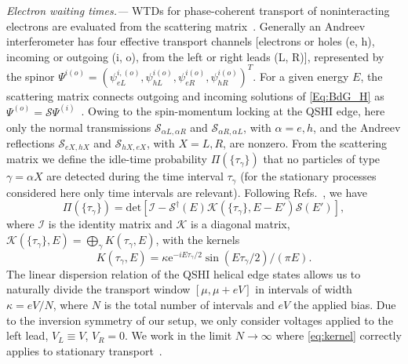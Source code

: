 \documentclass[aps,prl,amsmath,twocolumn,floatfix,superscriptaddress,longbibliography,footinbib]{revtex4-1}
\newcommand{\e}{\mathrm{e}}
\begin{document}
\textit{Electron waiting times.---}
WTDs for phase-coherent transport of noninteracting electrons are evaluated from the scattering matrix~\cite{Albert2012,Haack2014,Mi2018}. 
Generally an Andreev interferometer has four effective transport channels [electrons or holes (e, h), incoming or outgoing (i, o), from the left or right leads (L, R)], represented by the spinor $\Psi^{i(o)}=(\psi_{eL}^{i,(o)}, \psi_{hL}^{i(o)}, \psi_{eR}^{i(o)}, \psi_{hR}^{i(o)})^T$. For a given energy $E$, the scattering matrix connects outgoing and incoming solutions of \cref{Eq:BdG_H} as $\Psi^{(o)}= \mathcal{S}\Psi^{(i)}$~\cite{SM}. 
Owing to the spin-momentum locking at the QSHI edge, here only the normal transmissions $\mathcal{S}_{\alpha L,\alpha R}$ and $ \mathcal{S}_{\alpha R,\alpha L}$, with $\alpha=e,h$, and the Andreev reflections $ \mathcal{S}_{e X, hX}$ and $ \mathcal{S}_{h X, e X}$, with $X=L,R$, are nonzero. 
From the scattering matrix we define the idle-time probability $\Pi(\{\tau_\gamma\})$ that no particles of type $\gamma=\alpha X$ are detected during the time interval $\tau_\gamma$ (for the stationary processes considered here only time intervals are relevant). Following Refs.~\cite{Haack2014, Mi2018}, we have
\begin{equation}\label{eq:itp}
	\Pi(\{\tau_\gamma\})= \mathrm{det}[\mathcal{I}-\mathcal{S}^{\dagger}(E) \mathcal{K}(\{\tau_\gamma\},E-E') \mathcal{S}(E') ] , 
\end{equation}
where $\mathcal{I}$ is the identity matrix and $\mathcal{K}$ is a diagonal matrix, 
$\mathcal{K}(\{\tau_\gamma\},E) =\bigoplus_{\gamma} K( \tau_\gamma, E)$,
with the kernels~\cite{SM}
\begin{equation}\label{eq:kernel}
	K(\tau_\gamma, E)= \kappa \e^{-i E \tau_\gamma/2 } \sin (E \tau_\gamma/2) / (\pi E ) . 
\end{equation}
The linear dispersion relation of the QSHI helical edge states allows us to naturally divide the transport window $[\mu , \mu + eV ]$ in intervals of width $\kappa=eV/N$, where $N$ is the total number of intervals and $eV$ the applied bias. Due to the inversion symmetry of our setup, we only consider voltages applied to the left lead, $V_L\equiv V$, $V_R=0$. We work in the limit $N\rightarrow\infty$ where \cref{eq:kernel} correctly applies to stationary transport~\cite{Haack2014}. 
\end{document}
